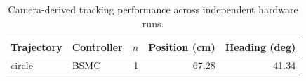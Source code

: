 \begin{table}[!t]
\centering
\caption{Camera-derived tracking performance across independent hardware runs.}
\label{tab:tracking}
\begin{tabular}{llrrr}
\hline
Trajectory & Controller & $n$ & Position (cm) & Heading (deg) \\
\hline
circle & BSMC & 1 & 67.28 & 41.34 \\
\hline
\end{tabular}
\end{table}
